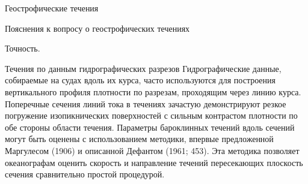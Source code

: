 \begin{chapter}{Геострофические течения}
\begin{section}{Пояснения к вопросу о геострофических течениях}
\begin{paragraph}{Точность.}
\end{paragraph}
\end{section}

\begin{section}{Течения по данным гидрографических разрезов}
Гидрографические данные, собираемые на судах вдоль их курса, часто
используются для построения вертикального профиля плотности по
разрезам, проходящим через линию курса. Поперечные сечения линий тока
в течениях зачастую демонстрируют резкое погружение изопикнических
поверхностей с сильным контрастом плотности по обе стороны области
течения. Параметры бароклинных течений вдоль сечений могут быть
оценены с использованием методики, впервые предложенной Маргулесом
(1906) и описанной Дефантом (1961; 453). Эта методика позволяет
океанографам оценить скорость и направление течений пересекающих
плоскость сечения сравнительно простой процедурой.
%


\end{section}
\end{chapter}
